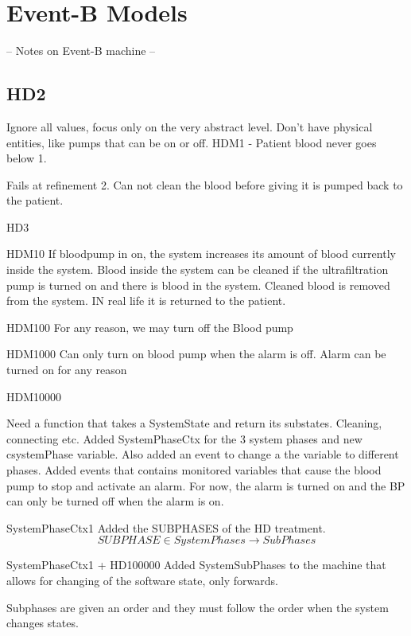 \section{Event-B Models}
-- Notes on Event-B machine --

\subsection{HD2}
Ignore all values, focus only on the very abstract level. Don't have physical entities, like pumps that can be on or off.
HDM1 - Patient blood never goes below 1.


Fails at refinement 2. Can not clean the blood before giving it is pumped back to the patient.

HD3

HDM10
If bloodpump in on, the system increases its amount of blood currently inside the system.
Blood inside the system can be cleaned if the ultrafiltration pump is turned on and there is blood in the system.
Cleaned blood is removed from the system. IN real life it is returned to the patient. 

HDM100
For any reason, we may turn off the Blood pump

HDM1000
Can only turn on blood pump when the alarm is off.
Alarm can be turned on for any reason

HDM10000

Need a function that takes a SystemState and return its substates. Cleaning, connecting etc.
Added SystemPhaseCtx for the 3 system phases and new csystemPhase variable. Also added an event to change a the variable to different phases.
Added events that contains monitored variables that cause the blood pump to stop and activate an alarm. For now, the alarm is turned on and the BP can only be turned off when the alarm is on.


SystemPhaseCtx1
Added the SUBPHASES of the HD treatment. $$ SUBPHASE \in SystemPhases \longrightarrow SubPhases $$



SystemPhaseCtx1 + HD100000
Added SystemSubPhases to the machine that allows for changing of the software state, only forwards.

Subphases are given an order and they must follow the order when the system changes states.












